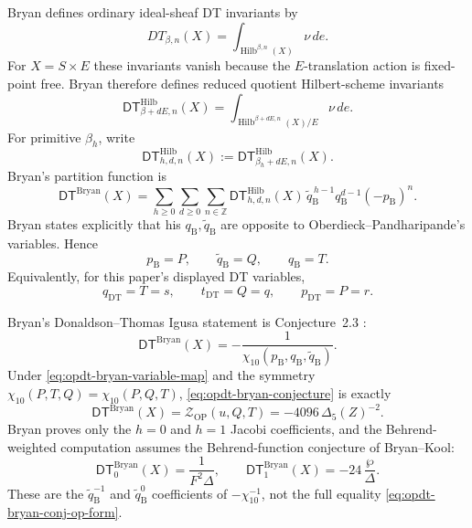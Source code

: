 Bryan defines ordinary ideal-sheaf DT invariants by
\begin{equation}
\label{eq:opdt-bryan-ordinary-dt}
DT_{\beta,n}(X)
=
\int_{\operatorname{Hilb}^{\beta,n}(X)}\nu\,de.
\end{equation}
For \(X=S\times E\) these invariants vanish because the \(E\)-translation
action is fixed-point free.  Bryan therefore defines reduced quotient
Hilbert-scheme invariants \cite[Definition 2.1]{BRYAN}
\begin{equation}
\label{eq:opdt-bryan-reduced-dt}
\mathsf{DT}^{\mathrm{Hilb}}_{\beta+dE,n}(X)
=
\int_{\operatorname{Hilb}^{\beta+dE,n}(X)/E}\nu\,de.
\end{equation}
For primitive \(\beta_h\), write
\begin{equation}
\label{eq:opdt-bryan-index}
\mathsf{DT}^{\mathrm{Hilb}}_{h,d,n}(X)
:=
\mathsf{DT}^{\mathrm{Hilb}}_{\beta_h+dE,n}(X).
\end{equation}
Bryan's partition function is
\begin{equation}
\label{eq:opdt-bryan-series}
\mathsf{DT}^{\mathrm{Bryan}}(X)
=
\sum_{h\geq0}\sum_{d\geq0}\sum_{n\in\mathbb Z}
\mathsf{DT}^{\mathrm{Hilb}}_{h,d,n}(X)\,
\widetilde q_{\mathrm B}^{\,h-1}q_{\mathrm B}^{d-1}(-p_{\mathrm B})^n.
\end{equation}
Bryan states explicitly that his \(q_{\mathrm B},\widetilde q_{\mathrm B}\)
are opposite to Oberdieck--Pandharipande's variables.  Hence
\begin{equation}
\label{eq:opdt-bryan-variable-map}
p_{\mathrm B}=P,\qquad
\widetilde q_{\mathrm B}=Q,\qquad
q_{\mathrm B}=T.
\end{equation}
Equivalently, for this paper's displayed DT variables,
\begin{equation}
\label{eq:opdt-manuscript-dt-map}
q_{\mathrm{DT}}=T=s,\qquad
t_{\mathrm{DT}}=Q=q,\qquad
p_{\mathrm{DT}}=P=r.
\end{equation}

Bryan's Donaldson--Thomas Igusa statement is Conjecture~2.3
\cite{BRYAN}:
\begin{equation}
\label{eq:opdt-bryan-conjecture}
\mathsf{DT}^{\mathrm{Bryan}}(X)
=-\frac1{\chi_{10}(p_{\mathrm B},q_{\mathrm B},
\widetilde q_{\mathrm B})}.
\end{equation}
Under \eqref{eq:opdt-bryan-variable-map} and the symmetry
\(\chi_{10}(P,T,Q)=\chi_{10}(P,Q,T)\),
\eqref{eq:opdt-bryan-conjecture} is exactly
\begin{equation}
\label{eq:opdt-bryan-conj-op-form}
\mathsf{DT}^{\mathrm{Bryan}}(X)
=
\mathcal Z_{\mathrm{OP}}(u,Q,T)
=
-4096\,\Delta_5(Z)^{-2}.
\end{equation}
Bryan proves only the \(h=0\) and \(h=1\) Jacobi coefficients, and the
Behrend-weighted computation assumes the Behrend-function conjecture of
Bryan--Kool:
\begin{equation}
\label{eq:opdt-bryan-h01}
\mathsf{DT}^{\mathrm{Bryan}}_{0}(X)=\frac1{F^2\Delta},
\qquad
\mathsf{DT}^{\mathrm{Bryan}}_{1}(X)=-24\,\frac{\wp}{\Delta}.
\end{equation}
These are the \(\widetilde q_{\mathrm B}^{-1}\) and
\(\widetilde q_{\mathrm B}^{0}\) coefficients of
\(-\chi_{10}^{-1}\), not the full equality
\eqref{eq:opdt-bryan-conj-op-form}.

